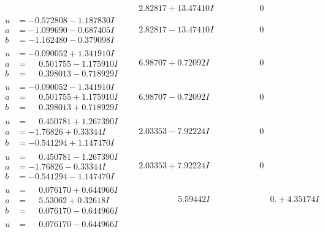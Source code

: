 \documentclass[1p]{elsarticle_modified}
\theoremstyle{definition}
\begin{document}
$$\begin{array}{c|c|c}
 & \phantom{-}2.82817 + 13.47410 I & \phantom{-0.000000 } 0 \\ \hline\begin{aligned}
u &= -0.572808 - 1.187830 I \\
a &= -1.099690 - 0.687405 I \\
b &= -1.162480 - 0.379098 I\end{aligned}
 & \phantom{-}2.82817 - 13.47410 I & \phantom{-0.000000 } 0 \\ \hline\begin{aligned}
u &= -0.090052 + 1.341910 I \\
a &= \phantom{-}0.501755 - 1.175910 I \\
b &= \phantom{-}0.398013 - 0.718929 I\end{aligned}
 & \phantom{-}6.98707 + 0.72092 I & \phantom{-0.000000 } 0 \\ \hline\begin{aligned}
u &= -0.090052 - 1.341910 I \\
a &= \phantom{-}0.501755 + 1.175910 I \\
b &= \phantom{-}0.398013 + 0.718929 I\end{aligned}
 & \phantom{-}6.98707 - 0.72092 I & \phantom{-0.000000 } 0 \\ \hline\begin{aligned}
u &= \phantom{-}0.450781 + 1.267390 I \\
a &= -1.76826 + 0.33344 I \\
b &= -0.541294 + 1.147470 I\end{aligned}
 & \phantom{-}2.03353 - 7.92224 I & \phantom{-0.000000 } 0 \\ \hline\begin{aligned}
u &= \phantom{-}0.450781 - 1.267390 I \\
a &= -1.76826 - 0.33344 I \\
b &= -0.541294 - 1.147470 I\end{aligned}
 & \phantom{-}2.03353 + 7.92224 I & \phantom{-0.000000 } 0 \\ \hline\begin{aligned}
u &= \phantom{-}0.076170 + 0.644966 I \\
a &= \phantom{-}5.53062 + 0.32618 I \\
b &= \phantom{-}0.076170 - 0.644966 I\end{aligned}
 & \phantom{-0.000000 -}5.59442 I & \phantom{-0.000000 -}0. + 4.35174 I \\ \hline\begin{aligned}
u &= \phantom{-}0.076170 - 0.644966 I \\

\end{aligned}
\end{array}$$
\end{document}
